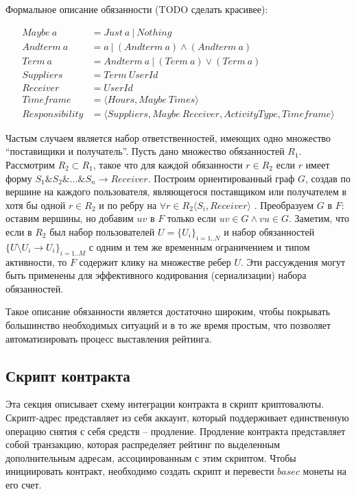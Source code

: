 \documentclass[specification,annotation]{itmo-student-thesis}
\begin{document}
Формальное описание обязанности (TODO сделать красивее):

\begin{align*}
Maybe \ a &= Just \ a \ | \ Nothing \\
Andterm \ a &= a \ | \ (Andterm \ a) \wedge (Andterm \ a) \\
Term \ a &= Andterm \ a \ | \ (Term \ a) \vee (Term \ a) \\
Suppliers &= Term \ UserId\\
Receiver &= UserId\\
Timeframe &= \langle Hours, Maybe \ Times \rangle\\
Responsibility &= \langle Suppliers, Maybe \ Receiver, ActivityType, Timeframe \rangle
\end{align*}

Частым случаем является набор ответственностей, имеющих одно множество
``поставищики и получатель''. Пусть дано множество обязанностей
$R_1$. Рассмотрим $R_2 \subset R_1$, такое что для каждой обязанности
$r \in R_2$ если $r$ имеет форму $S_1\&S_2\&…\&S_n \rightarrow
Receiver$. Построим ориентированный граф $G$, создав по вершине на
каждого пользователя, являющегося поставщиком или получателем в хотя
бы одной $r \in R_2$ и по ребру на $\forall r \in R_2 \langle S_i,
Receiver \rangle$ . Преобразуем $G$ в $F$: оставим вершины, но добавим
$uv$ в $F$ только если $uv \in G \wedge vu \in G$. Заметим, что если в
$R_2$ был набор пользователей $U = \{U_i\}_{i=1..N}$ и набор
обязанностей $\{U \setminus U_i \rightarrow U_i\}_{i=1..M}$ с одним и
тем же временным ограничением и типом активности, то $F$ содержит
клику на множестве ребер $U$. Эти рассуждения могут быть применены для
эффективного кодирования (сериализации) набора обязанностей.

Такое описание обязанности является достаточно широким, чтобы
покрывать большинство необходимых ситуаций и в то же время простым,
что позволяет автоматизировать процесс выставления рейтинга.

\subsection{Скрипт контракта}

Эта секция описывает схему интеграции контракта в скрипт
криптовалюты. Скрипт-адрес представляет из себя аккаунт, который
поддерживает единственную операцию снятия с себя средств --
продление. Продление контракта представляет собой транзакцию, которая
распределяет рейтинг по выделенным дополнительным адресам,
ассоциированным с этим скриптом. Чтобы инициировать контракт,
необходимо создать скрипт и перевести $basec$ монеты на его счет.
\end{document}
